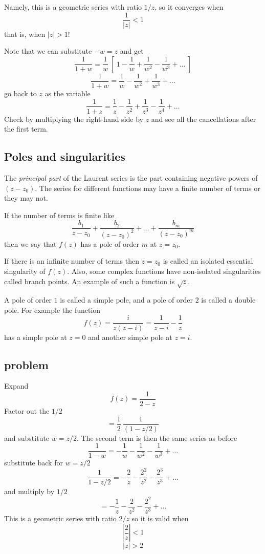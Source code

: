 \documentclass[11pt, oneside]{article}
\begin{document}
Namely, this is a geometric series with ratio $1/z$, so it converges when 
\[ \frac{1}{|z|} < 1 \]
that is, when $|z| > 1$!

Note that we can substitute $-w = z$ and get
\[ \frac{1}{1+w} =  \frac{1}{w} \ [ \ 1 - \frac{1}{w} + \frac{1}{w^2} - \frac{1}{w^3} + \dots \ ] \]
\[ \frac{1}{1+w} =  \frac{1}{w} - \frac{1}{w^2} + \frac{1}{w^3} + \dots \]
go back to $z$ as the variable
\[ \frac{1}{1+z} =  \frac{1}{z} - \frac{1}{z^2} + \frac{1}{z^3} - \frac{1}{z^4} + \dots \]
Check by multiplying the right-hand side by $z$ and see all the cancellations after the first term.

\subsection*{Poles and singularities}
The \emph{principal part} of the Laurent series is the part containing negative powers of $(z - z_0)$.  The series for different functions may have a finite number of terms or they may not.  

If the number of terms is finite like
\[ \frac{b_1}{z-z_0} + \frac{b_2}{(z-z_0)^2} + \dots + \frac{b_m}{(z-z_0)^m} \]
then we say that $f(z)$ has a pole of order $m$ at $ z = z_0$.

If there is an infinite number of terms then $z = z_0$ is called an isolated essential singularity of $f(z)$.  Also, some complex functions have non-isolated singularities called branch points. An example of such a function is $\sqrt{z}$.

A pole of order $1$ is called a simple pole, and a pole of order $2$ is called a double pole.  For example the function
\[ f(z) = \frac{i}{z(z-i)} = \frac{1}{z-i} - \frac{1}{z} \]
has a simple pole at $z = 0$ and another simple pole at $z = i$.  

\subsection*{problem}
Expand 
\[ f(z) = \frac{1}{2 - z} \]
Factor out the $1/2$ 
\[ = \frac{1}{2} \ \frac{1}{(1 - z/2)} \]
and substitute $w = z/2$.  The second term is then the same series as before
\[ \frac{1}{1-w} = - \frac{1}{w} - \frac{1}{w^2} - \frac{1}{w^3} + \dots \]
substitute back for $w = z/2$
\[ \frac{1}{1 - z/2} = - \frac{2}{z} - \frac{2^2}{z^2} - \frac{2^3}{z^3} + \dots \]
and multiply by $1/2$
\[ = - \frac{1}{z} - \frac{2}{z^2} - \frac{2^2}{z^3} + \dots \]
This is a geometric series with ratio $2/z$ so it is valid when
\[ | \frac{2}{z}|  < 1 \]
\[ |z| > 2 \]
\end{document}
